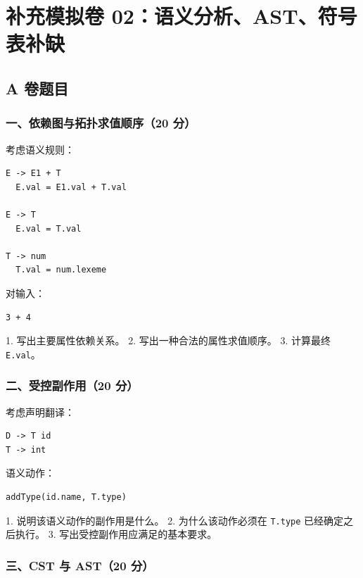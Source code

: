 \documentclass[UTF8]{ctexart}
\begin{document}
\section*{补充模拟卷 02：语义分析、AST、符号表补缺}

\subsection*{A 卷题目}

\subsubsection*{一、依赖图与拓扑求值顺序（20 分）}

考虑语义规则：

\begin{Verbatim}[fontsize=\small,breaklines=true]
E -> E1 + T
  E.val = E1.val + T.val

E -> T
  E.val = T.val

T -> num
  T.val = num.lexeme
\end{Verbatim}

对输入：

\begin{Verbatim}[fontsize=\small,breaklines=true]
3 + 4
\end{Verbatim}

1. 写出主要属性依赖关系。 2. 写出一种合法的属性求值顺序。 3. 计算最终 \texttt{E.val}。

\subsubsection*{二、受控副作用（20 分）}

考虑声明翻译：

\begin{Verbatim}[fontsize=\small,breaklines=true]
D -> T id
T -> int
\end{Verbatim}

语义动作：

\begin{Verbatim}[fontsize=\small,breaklines=true]
addType(id.name, T.type)
\end{Verbatim}

1. 说明该语义动作的副作用是什么。 2. 为什么该动作必须在 \texttt{T.type} 已经确定之后执行。 3. 写出受控副作用应满足的基本要求。

\subsubsection*{三、CST 与 AST（20 分）}
\end{document}
